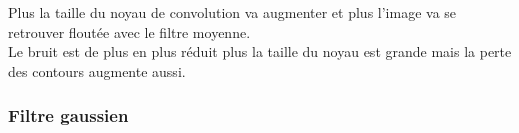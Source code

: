 \documentclass{article}
\begin{document}
\begin{enumerate}[label=\arabic*$\degres$)]
Plus la taille du noyau de convolution va augmenter et plus l'image va se retrouver floutée avec le filtre moyenne.\\

Le bruit est de plus en plus réduit plus la taille du noyau est grande mais la perte des contours augmente aussi.


\subsubsection*{Filtre gaussien}
	\begin{minipage}[b]{0.40\linewidth}
	\end{minipage}\hfill
	\begin{minipage}[b]{0.48\linewidth}
	\end{minipage}\hfill
	\begin{minipage}[b]{0.40\linewidth}
	\end{minipage}\hfill
	

\end{enumerate}
\end{document}
